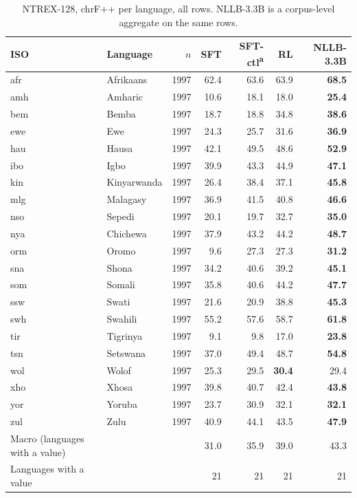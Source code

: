 \begin{table}[t]
\centering\footnotesize
\setlength{\tabcolsep}{3pt}
\begin{tabular}{@{}llrrrrr@{}}
\toprule
ISO & Language & $n$ & SFT & SFT-ctl\textsuperscript{a} & RL & NLLB-3.3B \\
\midrule
afr & Afrikaans & 1997 & 62.4 & 63.6 & 63.9 & \textbf{68.5} \\
amh & Amharic & 1997 & 10.6 & 18.1 & 18.0 & \textbf{25.4} \\
bem & Bemba & 1997 & 18.7 & 18.8 & 34.8 & \textbf{38.6} \\
ewe & Ewe & 1997 & 24.3 & 25.7 & 31.6 & \textbf{36.9} \\
hau & Hausa & 1997 & 42.1 & 49.5 & 48.6 & \textbf{52.9} \\
ibo & Igbo & 1997 & 39.9 & 43.3 & 44.9 & \textbf{47.1} \\
kin & Kinyarwanda & 1997 & 26.4 & 38.4 & 37.1 & \textbf{45.8} \\
mlg & Malagasy & 1997 & 36.9 & 41.5 & 40.8 & \textbf{46.6} \\
nso & Sepedi & 1997 & 20.1 & 19.7 & 32.7 & \textbf{35.0} \\
nya & Chichewa & 1997 & 37.9 & 43.2 & 44.2 & \textbf{48.7} \\
orm & Oromo & 1997 & 9.6 & 27.3 & 27.3 & \textbf{31.2} \\
sna & Shona & 1997 & 34.2 & 40.6 & 39.2 & \textbf{45.1} \\
som & Somali & 1997 & 35.8 & 40.6 & 44.2 & \textbf{47.7} \\
ssw & Swati & 1997 & 21.6 & 20.9 & 38.8 & \textbf{45.3} \\
swh & Swahili & 1997 & 55.2 & 57.6 & 58.7 & \textbf{61.8} \\
tir & Tigrinya & 1997 & 9.1 & 9.8 & 17.0 & \textbf{23.8} \\
tsn & Setswana & 1997 & 37.0 & 49.4 & 48.7 & \textbf{54.8} \\
wol & Wolof & 1997 & 25.3 & 29.5 & \textbf{30.4} & 29.4 \\
xho & Xhosa & 1997 & 39.8 & 40.7 & 42.4 & \textbf{43.8} \\
yor & Yoruba & 1997 & 23.7 & 30.9 & 32.1 & \textbf{32.1} \\
zul & Zulu & 1997 & 40.9 & 44.1 & 43.5 & \textbf{47.9} \\
\midrule
Macro (languages with a value) & & & 31.0 & 35.9 & 39.0 & 43.3 \\
Languages with a value & & & 21 & 21 & 21 & 21 \\
\bottomrule
\end{tabular}
\caption{NTREX-128, chrF++ per language, all rows. NLLB-3.3B is a corpus-level aggregate on the same rows.}
\label{tab:full-ntrex-chrfpp}
\end{table}

